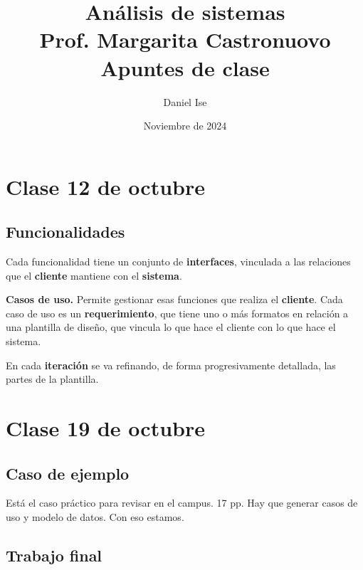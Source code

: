 \documentclass[12pt]{article}
\title{Análisis de sistemas\\
       Prof. Margarita Castronuovo\\
       Apuntes de clase
}
\author{Daniel Ise}
\date{Noviembre de 2024}
\begin{document}
\maketitle

\tableofcontents

\section{Clase 12 de octubre}

\subsection{Funcionalidades}

Cada funcionalidad tiene un conjunto de \textbf{interfaces},
vinculada a las relaciones que el \textbf{cliente} mantiene con el \textbf{sistema}.

\textbf{Casos de uso.}
Permite gestionar esas funciones que realiza el \textbf{cliente}.
Cada caso de uso es un \textbf{requerimiento},
que tiene uno o más formatos en relación a una plantilla de diseño,
que vincula lo que hace el cliente con lo que hace el sistema.

En cada \textbf{iteración} se va refinando,
de forma progresivamente detallada,
las partes de la plantilla.

\section{Clase 19 de octubre}

\subsection{Caso de ejemplo}

Está el caso práctico para revisar en el campus.
17 pp.
Hay que generar casos de uso y modelo de datos.
Con eso estamos.

\subsection{Trabajo final}
\end{document}
